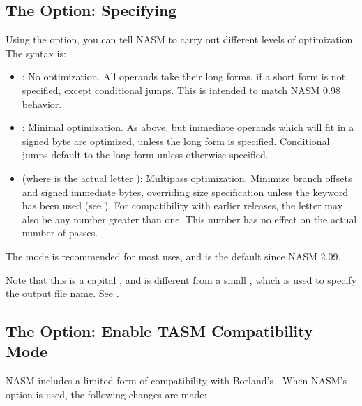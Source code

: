 \subsection{The  Option: Specifying }
\label{subsec:opt-O-cap}

Using the  option, you can tell NASM to carry out different
levels of optimization.  The syntax is:

\begin{itemize}
	\item {}: No optimization. All operands take their
	long forms, if a short form is not specified, except conditional
	jumps. This is intended to match NASM 0.98 behavior.

	\item {}: Minimal optimization. As above, but immediate
	operands which will fit in a signed byte are optimized,
        unless the long form is specified. Conditional jumps default
        to the long form unless otherwise specified.

	\item {} (where  is the actual letter ):
	Multipass optimization. Minimize branch offsets and signed immediate
	bytes, overriding size specification unless the  keyword
        has been used (see ). For compatibility with earlier
        releases, the letter  may also be any number greater than
        one. This number has no effect on the actual number of passes.
\end{itemize}

The  mode is recommended for most uses, and is the default
since NASM 2.09.

Note that this is a capital , and is different from a small ,
which is used to specify the output file name. See .

\subsection{The  Option: Enable TASM Compatibility Mode}
\label{subsec:opt-t}

NASM includes a limited form of compatibility with Borland's .
When NASM's  option is used, the following changes are made:


